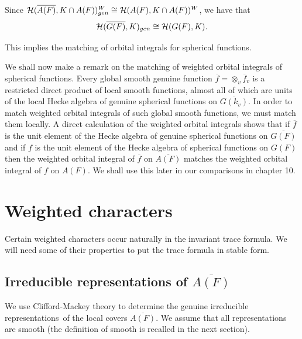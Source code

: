 Since
${\cal{H}}(\overline{A(F)},K\cap A(F))^W_{gen}\cong
{\cal{H}}(A(F),K\cap A(F))^W$, we have that
\[
{\cal{H}}(\overline{G(F)},K)_{gen}\cong {\cal{H}}(G(F),K).
\]

This implies the matching of orbital integrals for spherical functions.

We shall now make a remark on the matching of
weighted orbital integrals of spherical functions.
Every global smooth genuine function
$\overline{f}=\otimes_v\overline{f}_v$ is a restricted direct product
of local smooth functions, almost all of which are units of the
local Hecke algebra of genuine spherical functions on
$\overline{G(k_v)}$. In order to match weighted orbital integrals
of such global smooth functions, we must match them locally.
A direct calculation of the weighted orbital integrals
shows that if $\overline{f}$ is 
the unit element of the Hecke algebra of genuine spherical functions on
$\overline{G(F)}$ and if $f$ is the
unit element of the Hecke algebra of spherical functions on
$G(F)$ then the weighted orbital integral of $\overline{f}$ on
$\overline{A(F)}$ matches the weighted orbital integral of $f$ on
$A(F)$. We shall use this later in our comparisons in chapter 10.

\section{Weighted characters}

Certain weighted characters occur naturally in the invariant trace formula.
We will need some of their properties to put the trace formula in stable
form. 

\subsection{Irreducible representations of $\overline{A(F)}$}

We use Clifford-Mackey theory to determine the genuine irreducible
representations\ of the local covers $\overline{A(F)}$. We assume that all
representations are smooth (the definition of smooth is recalled in the next
section).

